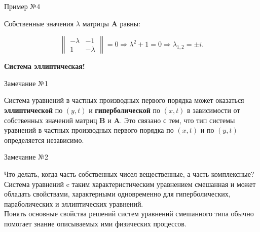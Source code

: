 \documentclass[10pt,xcolor=pst,aspectratio=169]{beamer}
\begin{document}
\begin{frame}{Пример №4}

	\transdissolve[duration=0.1]
	\justifying
	\large

	Собственные значения $\lambda$ матрицы $\textbf{A}$ равны:

	\[
		\begin{Vmatrix}
			- \lambda & - 1 \\
			1 & - \lambda
		\end{Vmatrix}
		= 0
		\Rightarrow \lambda^2 + 1 = 0
		\Rightarrow \lambda_{1,2} = \pm i.
	\]

	\textbf{Система эллиптическая!}

\end{frame}

\begin{frame}{Замечание №1}

	\transdissolve[duration=0.1]
	\justifying
	\large

	Система уравнений в частных производных первого порядка может оказаться \textbf{эллиптической} по $(y,t)$ и \textbf{гиперболической} по $(x,t)$ в зависимости от собственных значений матриц $\textbf{B}$ и $\textbf{A}$. Это связано с тем, что тип системы уравнений в частных производных первого порядка по $(x,t)$ и по $(y,t)$ определяется независимо.

\end{frame}

\begin{frame}{Замечание №2}

	\transdissolve[duration=0.1]
	\justifying
	\large

	Что делать, когда часть собственных чисел вещественные, а часть комплексные?\\

	Система уравнений c таким характеристическим уравнением смешанная и может обладать свойствами, характерными одновременно для гиперболических, параболических и эллиптических уравнений.\\

	Понять основные свойства решений систем уравнений смешанного типа обычно помогает знание описываемых ими физических процессов.

\end{frame}
\end{document}
